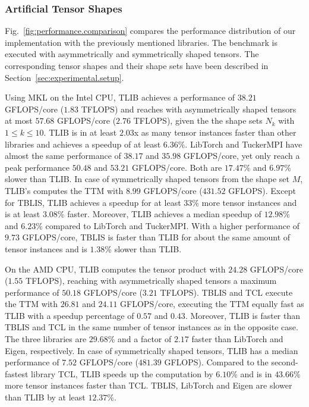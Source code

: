 \subsubsection{Artificial Tensor Shapes}
Fig.~\ref{fig:performance.comparison} compares the performance distribution of our implementation with the previously mentioned libraries.
The benchmark is executed with asymmetrically and symmetrically shaped tensors.
The corresponding tensor shapes and their shape sets have been described in Section~\ref{sec:experimental.setup}.

Using MKL on the Intel CPU, TLIB achieves a performance of $38.21$ GFLOPS/core ($1.83$ TFLOPS) and reaches with asymmetrically shaped tensors at most $57.68$ GFLOPS/core ($2.76$ TFLOPS), given the the shape sets $N_k$ with $1 \leq k \leq 10$.
TLIB is in at least $2.03$x as many tensor instances faster than other libraries and achieves a speedup of at least $6.36$\%.
LibTorch and TuckerMPI have almost the same performance of $38.17$ and $35.98$ GFLOPS/core, yet only reach a peak performance $50.48$ and $53.21$ GFLOPS/core.
Both are $17.47$\% and $6.97$\% slower than TLIB.
In case of symmetrically shaped tensors from the shape set $M$, TLIB's computes the TTM with $8.99$ GFLOPS/core ($431.52$ GFLOPS).
Except for TBLIS, TLIB achieves a speedup for at least $33$\% more tensor instances and is at least $3.08$\% faster.
Moreover, TLIB achieves a median speedup of $12.98$\% and $6.23$\% compared to LibTorch and TuckerMPI.
With a higher performance of $9.73$ GFLOPS/core, TBLIS is faster than TLIB for about the same amount of tensor instances and is $1.38$\% slower than TLIB.

On the AMD CPU, TLIB computes the tensor product with $24.28$ GFLOPS/core ($1.55$ TFLOPS), reaching with asymmetrically shaped tensors a maximum performance of $50.18$ GFLOPS/core ($3.21$ TFLOPS).
TBLIS and TCL execute the TTM with $26.81$ and $24.11$ GFLOPS/core, executing the TTM equally fast as TLIB with a speedup percentage of $0.57$ and $0.43$.
Moreover, TLIB is faster than TBLIS and TCL in the same number of tensor instances as in the opposite case.
The three libraries are $29.68$\% and a factor of $2.17$ faster than LibTorch and Eigen, respectively.
In case of symmetrically shaped tensors, TLIB has a median performance of $7.52$ GFLOPS/core ($481.39$ GFLOPS).
Compared to the second-fastest library TCL, TLIB speeds up the computation by $6.10$\% and is in $43.66$\% more tensor instances faster than TCL.
TBLIS, LibTorch and Eigen are slower than TLIB by at least $12.37$\%.

